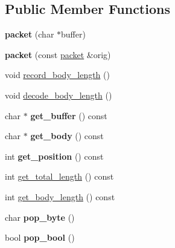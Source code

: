 \subsection*{Public Member Functions}
\begin{DoxyCompactItemize}
\item 
\mbox{\label{classmedianet_1_1packet_aa6d8ea5a983582b58a7d32e1e4a9fd4c}} 
{\bfseries packet} (char $\ast$buffer)
\item 
\mbox{\label{classmedianet_1_1packet_a349a93908f7227e7e14af36bbc1b0c1a}} 
{\bfseries packet} (const \mbox{\hyperlink{classmedianet_1_1packet}{packet}} \&orig)
\item 
void \mbox{\hyperlink{classmedianet_1_1packet_a6eb933f4883b15aed43929d855bb1641}{record\+\_\+body\+\_\+length}} ()
\item 
void \mbox{\hyperlink{classmedianet_1_1packet_a5b32d695828820879740c26f036066f0}{decode\+\_\+body\+\_\+length}} ()
\item 
\mbox{\label{classmedianet_1_1packet_a4f4c9b918313062b0108d428f9281d2a}} 
char $\ast$ {\bfseries get\+\_\+buffer} () const
\item 
\mbox{\label{classmedianet_1_1packet_a1ff66d2a1b4ebf05673e371a3da21e94}} 
char $\ast$ {\bfseries get\+\_\+body} () const
\item 
\mbox{\label{classmedianet_1_1packet_aa1382accdc576c747aac6bd4a5279f24}} 
int {\bfseries get\+\_\+position} () const
\item 
int \mbox{\hyperlink{classmedianet_1_1packet_a2ad2bbbbc2652deb8e4e3bdb58c865c0}{get\+\_\+total\+\_\+length}} () const
\item 
int \mbox{\hyperlink{classmedianet_1_1packet_a46bbdb1b6bc78d9d20e3b79caf1f52a8}{get\+\_\+body\+\_\+length}} () const
\item 
\mbox{\label{classmedianet_1_1packet_aca02750344d7846ea84566a6341d7e1a}} 
char {\bfseries pop\+\_\+byte} ()
\item 
\mbox{\label{classmedianet_1_1packet_a43c66ed972ad69c13f5df53cda029707}} 
bool {\bfseries pop\+\_\+bool} ()
\item 

\end{DoxyCompactItemize}
